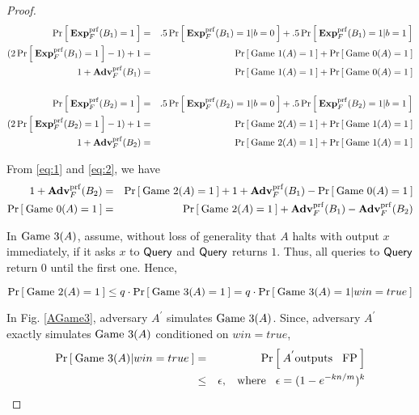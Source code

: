\begin{proof}
\begin{eqnarray}
\nonumber \Pr\left[\: \mathbf{Exp}^{\mathrm{prf}}_{F}(B_1) = 1 \:\right] &=& .5\Pr\left[\: \mathbf{Exp}^{\mathrm{prf}}_{F}(B_1)=1|b=0 \:\right] + .5\Pr\left[\: \mathbf{Exp}^{\mathrm{prf}}_{F}(B_1) = 1|b=1 \:\right]\\
\nonumber (2\Pr\left[\: \mathbf{Exp}^{\mathrm{prf}}_{F}(B_1) = 1 \:\right] - 1) + 1 &=& \Pr\left[\: \text{Game 1}(A)=1 \:\right] + \Pr\left[\: \text{Game 0}(A)=1 \:\right]\\
 1 + \mathbf{Adv}^{\mathrm{prf}}_{F}(B_1) &=& \Pr\left[\: \text{Game 1}(A)=1 \:\right] + \Pr\left[\: \text{Game 0}(A)=1 \:\right] \label{eq:1}\\
\nonumber& &\\
\nonumber \Pr\left[\: \mathbf{Exp}^{\mathrm{prf}}_{F}(B_2) = 1 \:\right] &=& .5\Pr\left[\: \mathbf{Exp}^{\mathrm{prf}}_{F}(B_2)=1|b=0 \:\right] + .5\Pr\left[\: \mathbf{Exp}^{\mathrm{prf}}_{F}(B_2) = 1|b=1 \:\right]\\
\nonumber (2\Pr\left[\: \mathbf{Exp}^{\mathrm{prf}}_{F}(B_2) = 1 \:\right] - 1) + 1 &=& \Pr\left[\: \text{Game 2}(A)=1 \:\right] + \Pr\left[\: \text{Game 1}(A)=1 \:\right]\\
 1 + \mathbf{Adv}^{\mathrm{prf}}_{F}(B_2) &=& \Pr\left[\: \text{Game 2}(A)=1 \:\right] + \Pr\left[\: \text{Game 1}(A)=1 \:\right]\label{eq:2}
\end{eqnarray}

From \ref{eq:1} and \ref{eq:2}, we have
\begin{eqnarray}
\nonumber 1+\mathbf{Adv}^{\mathrm{prf}}_{F}(B_2) &=& \Pr\left[\: \text{Game 2}(A)=1 \:\right] + 1+\mathbf{Adv}^{\mathrm{prf}}_{F}(B_1) - \Pr\left[\: \text{Game 0}(A)=1 \:\right]\\
\Pr\left[\: \text{Game 0}(A)=1 \:\right] &=& \Pr\left[\: \text{Game 2}(A)=1 \:\right] + \mathbf{Adv}^{\mathrm{prf}}_{F}(B_1) - \mathbf{Adv}^{\mathrm{prf}}_{F}(B_2)\label{eq:2a}
\end{eqnarray}

In $\text{Game 3}(A)$, assume, without loss of generality that $A$ halts with output $x$ immediately, if it asks $x$ to $\mathsf{Query}$ and $\mathsf{Query}$ returns $1$. Thus, all queries to $\mathsf{Query}$ return 0 until the first one. Hence,

\begin{equation}
\Pr\left[\: \text{Game 2}(A)=1 \:\right] \leq q \cdot \Pr\left[\: \text{Game 3}(A)=1 \:\right] = q \cdot \Pr\left[\: \text{Game 3}(A)=1|win=true \:\right]\label{eq:3}
\end{equation}

In Fig. \ref{AGame3}, adversary $A^{'}$ simulates $\text{Game 3}(A)$. Since, adversary $A^{'}$ exactly simulates $\text{Game 3}(A)$ conditioned on $win = true$, 
\begin{eqnarray}
\nonumber \Pr\left[\: \text{Game 3}(A)|win=true \:\right] &=& \Pr\left[\: A^{'} \mathrm{outputs \hspace*{2ex} FP} \:\right]\\
& \leq & \epsilon, \hspace*{2ex} \mathrm{where} \hspace*{2ex} \epsilon = (1-e^{-kn/m})^k\label{eq:4}
\end{eqnarray}


\end{proof}
